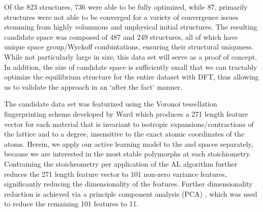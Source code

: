 %
Of the \num{823} structures, \num{736} were able to be fully optimized, while \num{87}, primarily \ABtwo structures were not able to be converged for a variety of convergence issues stemming from highly volumnous and unphysical initial structures.
%
The resulting candidate space was composed of \num{487} \IrOtwo and \num{249} \IrOthree structures, all of which have unique space group/Wyckoff combintations, ensuring their structural uniquness.
%
While not particularly large in size, this data set will serve as a proof of concept.
%
In addition, the size of candidate space is sufficiently small that we can tractably optimize the equilibrium structure for the entire dataset with  DFT, thus allowing us to validate the approach in an `after the fact` manner.


%
%
The candidate data set was featurized using the Voronoi tessellation fingerprinting scheme developed by Ward  \cite{Ward2017} which produces a \num{271} length feature vector for each material that is invariant to isotropic expansions/contractions of the lattice and to a degree, insensitive to the exact atomic coordinates of the atoms.
%
Herein, we apply our active learning model to the \IrOtwo and \IrOthree spaces separately, because we are interested in the most stable polymorphs at each stoichiometry.
%
Contraining the stoicheometry per application of the AL algorithm further reduces the \num{271} length  feature vector to \num{101} non-zero variance features,
significantly reducing the dimensionality of the features.
%
Further dimensionality reduction is achieved via a principle component analysis (PCA) \cite{Tipping1999}, which was used to reduce the remaining \num{101} features to \num{11}.


